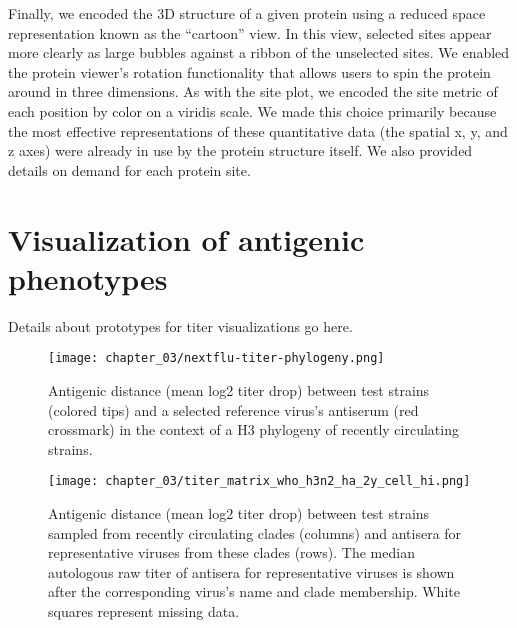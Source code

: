 Finally, we encoded the 3D structure of a given protein using a reduced space representation known as the ``cartoon'' view.
In this view, selected sites appear more clearly as large bubbles against a ribbon of the unselected sites.
We enabled the protein viewer's rotation functionality that allows users to spin the protein around in three dimensions.
As with the site plot, we encoded the site metric of each position by color on a viridis scale.
We made this choice primarily because the most effective representations of these quantitative data (the spatial x, y, and z axes) were already in use by the protein structure itself.
We also provided details on demand for each protein site.

\section{Visualization of antigenic phenotypes}

Details about prototypes for titer visualizations go here.

\begin{figure}
  \centering
  \texttt{[image: chapter\_03/nextflu-titer-phylogeny.png]}
  \caption{\label{fig:titer-phylogeny} Antigenic distance (mean log2 titer drop) between test strains (colored tips) and a selected reference virus's antiserum (red crossmark) in the context of a H3 phylogeny of recently circulating strains.}
\end{figure}

\begin{figure}
  \centering
  \texttt{[image: chapter\_03/titer\_matrix\_who\_h3n2\_ha\_2y\_cell\_hi.png]}
  \caption{\label{fig:titer-matrix} Antigenic distance (mean log2 titer drop) between test strains sampled from recently circulating clades (columns) and antisera for representative viruses from these clades (rows).
    The median autologous raw titer of antisera for representative viruses is shown after the corresponding virus's name and clade membership.
    White squares represent missing data.}
\end{figure}
